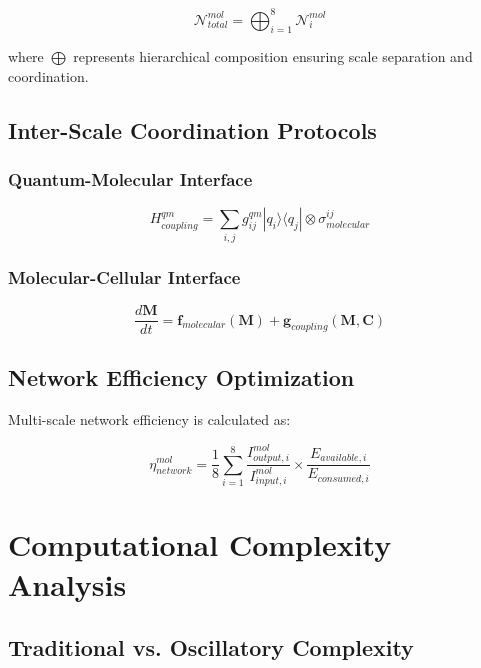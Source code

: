 \documentclass[12pt,a4paper]{article}
\begin{document}
\begin{equation}
\mathcal{N}_{total}^{mol} = \bigoplus_{i=1}^{8} \mathcal{N}_i^{mol}
\end{equation}

where $\bigoplus$ represents hierarchical composition ensuring scale separation and coordination.

\subsection{Inter-Scale Coordination Protocols}

\subsubsection{Quantum-Molecular Interface}
\begin{equation}
H_{coupling}^{qm} = \sum_{i,j} g_{ij}^{qm} |q_i\rangle\langle q_j| \otimes \sigma_{molecular}^{ij}
\end{equation}

\subsubsection{Molecular-Cellular Interface}
\begin{equation}
\frac{d\mathbf{M}}{dt} = \mathbf{f}_{molecular}(\mathbf{M}) + \mathbf{g}_{coupling}(\mathbf{M}, \mathbf{C})
\end{equation}

\subsection{Network Efficiency Optimization}

Multi-scale network efficiency is calculated as:

\begin{equation}
\eta_{network}^{mol} = \frac{1}{8} \sum_{i=1}^{8} \frac{I_{output,i}^{mol}}{I_{input,i}^{mol}} \times \frac{E_{available,i}}{E_{consumed,i}}
\end{equation}

\section{Computational Complexity Analysis}

\subsection{Traditional vs. Oscillatory Complexity}
\end{document}

